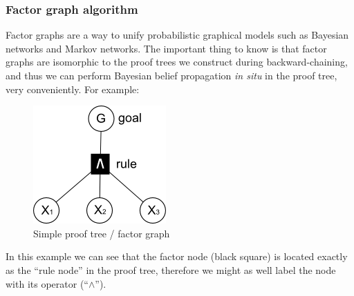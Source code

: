 



\subsubsection{Factor graph algorithm}

Factor graphs are a way to unify probabilistic graphical models such as Bayesian networks and Markov networks.  The important thing to know is that factor graphs are isomorphic to the proof trees we construct during backward-chaining, and thus we can perform Bayesian belief propagation \textit{in situ} in the proof tree, very conveniently.  For example:
\begin{figure}[H]
\centering
\includegraphics{simple-proof-tree.png}
\caption{Simple proof tree / factor graph}
\end{figure}
In this example we can see that the factor node (black square) is located exactly as the ``rule node'' in the proof tree, therefore we might as well label the node with its operator (``$\wedge$'').

